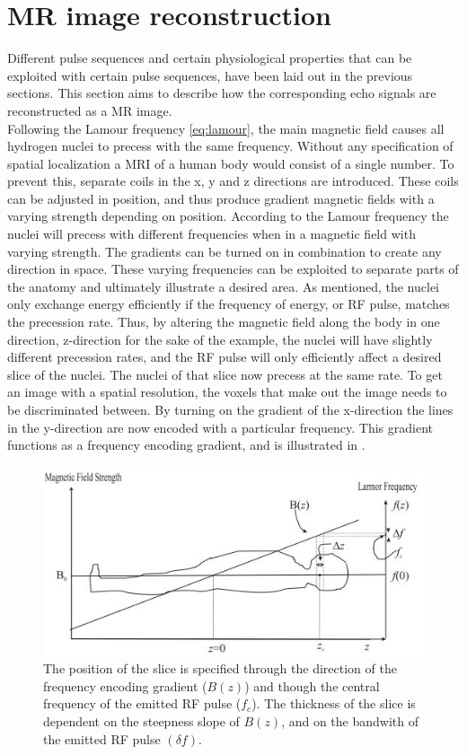 \section{MR image reconstruction}\label{sec:IMrec}

Different pulse sequences and certain physiological properties that can be exploited with certain pulse sequences, have been laid out in the previous sections. This section aims to describe how the corresponding echo signals are reconstructed as a MR image.\\
Following the Lamour frequency \eqref{eq:lamour}, the main magnetic field causes all hydrogen nuclei to precess with the same frequency. Without any specification of spatial localization a MRI of a human body would consist of a single number. To prevent this, separate coils in the x, y and z directions are introduced. These coils can be adjusted in position, and thus produce gradient magnetic fields with a varying strength depending on position. According to the Lamour frequency the nuclei will precess with different frequencies when in a magnetic field with varying strength. The gradients can be turned on in combination to create any direction in space. These varying frequencies can be exploited to separate parts of the anatomy and ultimately illustrate a desired area. As mentioned, the nuclei only exchange energy efficiently if the frequency of energy, or RF pulse, matches the precession rate. Thus, by altering the magnetic field along the body in one direction, z-direction for the sake of the example, the nuclei will have slightly different precession rates, and the RF pulse will only efficiently affect a desired slice of the nuclei.
The nuclei of that slice now precess at the same rate. To get an image with a spatial resolution, the voxels that make out the image needs to be discriminated between. By turning on the gradient of the x-direction the lines in the y-direction are now encoded with a particular frequency. This gradient functions as a frequency encoding gradient, and is illustrated in . \cite{Bharath2008} \\
 \begin{figure}[H]                 
	\includegraphics[width=.7\textwidth]{figures/aBackground/gradient}  
	\caption{The position of the slice is specified through the direction of the frequency encoding gradient ($B(z)$) and though the central frequency of the emitted RF pulse ($f_c$). The thickness of the slice is dependent on the steepness slope of $B(z)$, and on the bandwith of the emitted RF pulse $(\delta f)$. \cite{Bharath2008}}
	\label{fig:back:gradient} 
\end{figure} 
